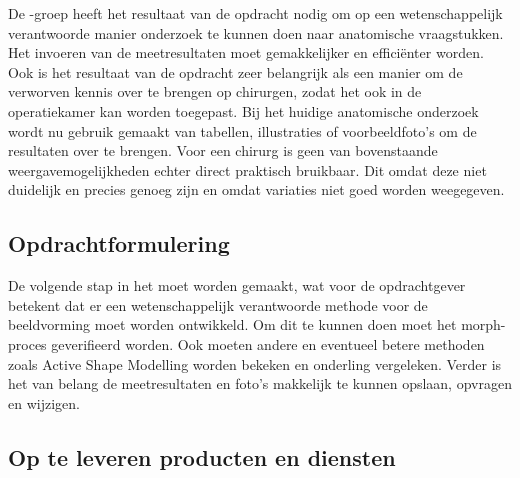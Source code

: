 De \casamproject-groep heeft het resultaat van de opdracht nodig om op een wetenschappelijk verantwoorde manier onderzoek te kunnen doen naar anatomische vraagstukken. 
Het invoeren van de meetresultaten moet gemakkelijker en effici\"enter worden. 
Ook is het resultaat van de opdracht zeer belangrijk als een manier om de verworven kennis over te brengen op chirurgen, zodat het ook in de operatiekamer kan worden toegepast. 
Bij het huidige anatomische onderzoek wordt nu gebruik gemaakt van tabellen, illustraties of voorbeeldfoto's om de resultaten over te brengen.
Voor een chirurg is geen van bovenstaande weergavemogelijkheden echter direct praktisch bruikbaar. Dit omdat deze niet duidelijk en precies genoeg zijn en omdat variaties niet goed worden weegegeven.



\subsection{Opdrachtformulering}

De volgende stap in het \casamproject moet worden gemaakt, wat voor de opdrachtgever betekent dat er een wetenschappelijk verantwoorde methode voor de beeldvorming moet worden ontwikkeld. 
Om dit te kunnen doen moet het morph-proces geverifieerd worden. 
Ook moeten andere en eventueel betere methoden zoals Active Shape Modelling worden bekeken en onderling vergeleken. 
Verder is het van belang de meetresultaten en foto's makkelijk te kunnen opslaan, opvragen en wijzigen. 


\subsection{Op te leveren producten en diensten}

